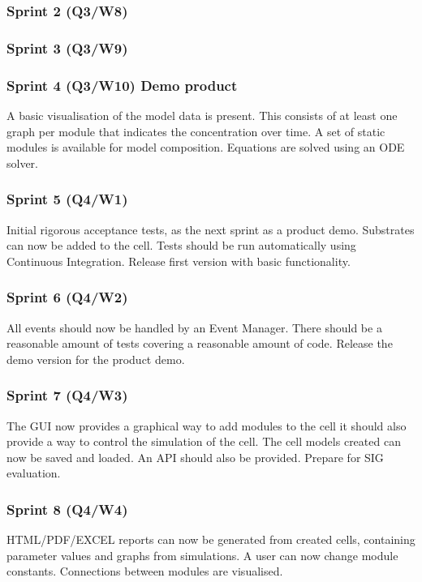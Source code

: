 \documentclass[10pt,a4paper]{report}
\begin{document}
			\subsubsection*{Sprint 2 (Q3/W8)}
				
			\subsubsection*{Sprint 3 (Q3/W9)}
				
			\subsubsection*{Sprint 4 (Q3/W10) Demo product}
				A basic visualisation of the model data is present. This consists of at least one graph per module that indicates the concentration over time. A set of static modules is available for model composition.	 Equations are solved using an ODE solver.
			\subsubsection*{Sprint 5 (Q4/W1)}
				Initial rigorous acceptance tests, as the next sprint as a product demo.  Substrates can now be added to the cell. Tests should be run automatically using Continuous Integration. Release first version with basic functionality.
			\subsubsection*{Sprint 6 (Q4/W2)}
				All events should now be handled by an Event Manager. There should be a reasonable amount of tests covering a reasonable amount of code. Release the demo version for the product demo.
			\subsubsection*{Sprint 7 (Q4/W3)}
				The GUI now provides a graphical way to add modules to the cell it should also provide a way to control the simulation of the cell. The cell models created can now be saved and loaded. An API should also be provided. Prepare for SIG evaluation.
			\subsubsection*{Sprint 8 (Q4/W4)}
				HTML/PDF/EXCEL reports can now be generated from created cells, containing parameter values and graphs from simulations. A user can now change module constants. Connections between modules are visualised. 
\end{document}
